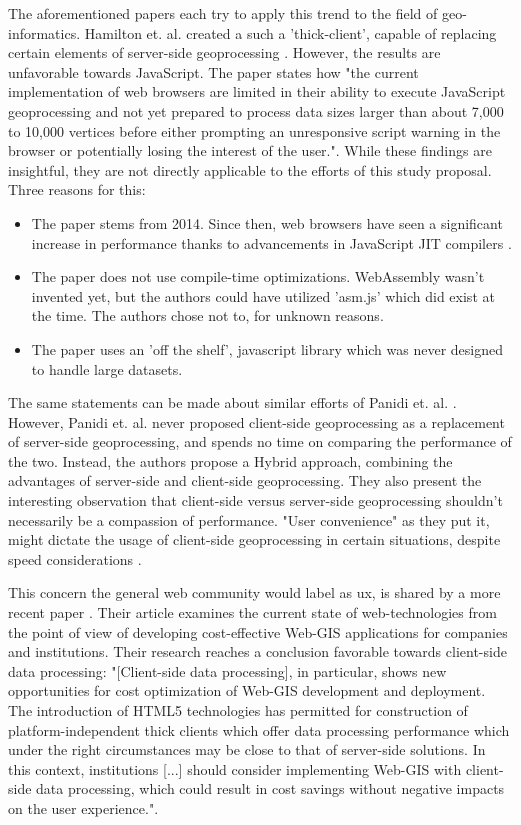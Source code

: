 The aforementioned papers each try to apply this trend to the field of geo-informatics. Hamilton et. al. created a such a 'thick-client', capable of replacing certain elements of server-side geoprocessing \cite{hamilton_client-side_2014}. However, the results are unfavorable towards JavaScript. The paper states how "the current implementation of web browsers are limited in their ability to execute JavaScript geoprocessing and not yet prepared to process data sizes larger than about 7,000 to 10,000 vertices before either prompting an unresponsive script warning in the browser or potentially losing the interest of the user.". While these findings are insightful, they are not directly applicable to the efforts of this study proposal. Three reasons for this:

\begin{itemize}
  \item The paper stems from 2014. Since then, web browsers have seen a significant increase in performance thanks to advancements in JavaScript JIT compilers \cite{haas_bringing_2017, kulawiak_analysis_2019}. 
  \item The paper does not use compile-time optimizations. WebAssembly wasn't invented yet, but the authors could have utilized 'asm.js' \cite{mozilla_asmjs_2013} which did exist at the time. The authors chose not to, for unknown reasons. 
  \item The paper uses an 'off the shelf', javascript library which was never designed to handle large datasets.
\end{itemize}

The same statements can be made about similar efforts of Panidi et. al. \cite{panidi_hybrid_2015}. However, Panidi et. al. never proposed client-side geoprocessing as a replacement of server-side geoprocessing, and spends no time on comparing the performance of the two. Instead, the authors propose a Hybrid approach, combining the advantages of server-side and client-side geoprocessing. They also present the interesting observation that client-side versus server-side geoprocessing shouldn't necessarily be a compassion of performance. "User convenience" as they put it, might dictate the usage of client-side geoprocessing in certain situations, despite speed considerations \cite{panidi_hybrid_2015}. 

This concern the general web community would label as \ac{ux}, is shared by a more recent paper \cite{kulawiak_analysis_2019}. Their article examines the current state of web-technologies from the point of view of developing cost-effective Web-GIS applications for companies and institutions. Their research reaches a conclusion favorable towards client-side data processing: "[Client-side data processing], in particular, shows new opportunities for cost optimization of Web-GIS development and deployment. The introduction of HTML5 technologies has permitted for construction of platform-independent thick clients which offer data processing performance which under the right circumstances may be close to that of server-side solutions. In this context, institutions [...] should consider implementing Web-GIS with client-side data processing, which could result in cost savings without negative impacts on the user experience.".

